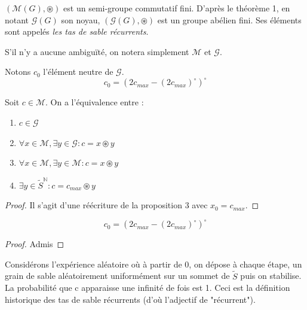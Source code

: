 \begin{definition}
$(\mathcal{M}(G), \circledast)$ est un semi-groupe commutatif fini.
D'après le théorème 1, en notant $\mathcal{G}(G)$ son noyau,
$(\mathcal{G}(G), \circledast)$ est un groupe abélien fini.
Ses éléments sont appelés \textit{les tas de sable récurrents}.
\end{definition}

S'il n'y a aucune ambiguïté, on notera simplement $\mathcal{M}$ et $\mathcal{G}$.

\begin{proposition}
Notons $c_0$ l'élément neutre de $\mathcal{G}$.
$$
c_0 = \left( 2 c_{max} - \left(2 c_{max}\right)^\circ \right)^\circ
$$
\end{proposition}

\begin{proposition}
Soit $c \in \mathcal{M}$.
On a l'équivalence entre :
\begin{enumerate}[label=\roman*)]
    \item $c \in \mathcal{G}$
    \item $\forall x \in \mathcal{M}, \exists y \in \mathcal{G} : c = x \circledast y$
    \item $\forall x \in \mathcal{M}, \exists y \in \mathcal{M} : c = x \circledast y$
    \item $\exists y \in \widetilde{S}^{\mathbb{N}} : c = c_{max} \circledast y$
\end{enumerate}
\end{proposition}

\begin{proof}
Il s'agit d'une réécriture de la proposition 3 avec $x_0 = c_{max}$.
\end{proof}

\begin{proposition}
$$
c_0 = \left(2 c_{max} - \left(2 c_{max}\right)^\circ \right)^\circ
$$
\end{proposition}

\begin{proof}
Admis
\end{proof}

\begin{proposition}
Considérons l'expérience aléatoire où à partir de $0$, on dépose à chaque étape,
un grain de sable aléatoirement uniformément sur un sommet de $\widetilde{S}$
puis on stabilise. La probabilité que c apparaisse une infinité de fois est 1.
Ceci est la définition historique des tas de sable récurrents (d'où l'adjectif
de "récurrent").
\end{proposition}

